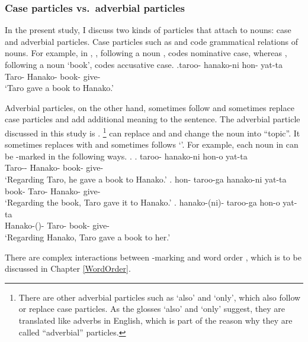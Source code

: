 \subsubsection{Case particles vs.~adverbial particles}

In the present study,
I discuss two kinds of particles that attach to nouns:
case and adverbial particles.
Case particles such as  and 
code grammatical relations of nouns.
For example, in \Next,
, following a noun , codes nominative case,
whereas , following a noun  `book', codes accusative case.
%
\exg.\label{ExShibatani90257}taroo- hanako-ni hon- yat-ta \\
        Taro- Hanako- book- give- \\
        `Taro gave a book to Hanako.'
  \hfill{\cite[257]{shibatani90}}


Adverbial particles, on the other hand,
sometimes follow and sometimes replace case particles
and add additional meaning to the sentence.
The adverbial particle discussed in this study is .%
 \footnote{
 There are other adverbial particles such as  `also' and  `only',
 which also follow or replace case particles.
 As the glosses `also' and `only' suggest,
 they are translated like adverbs in English,
 which is part of the reason why they are called ``adverbial'' particles.
 }
 can replace  and  and change the noun into ``topic''.
It sometimes replaces with and sometimes follows  `'.
For example,
each noun in \Last can be -marked in the following ways.
%
\ex. \ag. taroo- hanako-ni hon-o yat-ta \\
        Taro-- Hanako- book- give- \\
        `Regarding Taro, he gave a book to Hanako.'
 \bg. hon- taroo-{ga} hanako-ni yat-ta \\
      book- Taro- Hanako- give- \\
        `Regarding the book, Taro gave it to Hanako.'
 \bg. hanako-(ni)- taroo-{ga} hon-o yat-ta \\
      Hanako-()- Taro- book- give- \\
        `Regarding Hanako, Taro gave a book to her.'

There are complex interactions between -marking and word order \cite[e.g.,][]{kuroda79},
which is to be discussed in Chapter \ref{WordOrder}.



